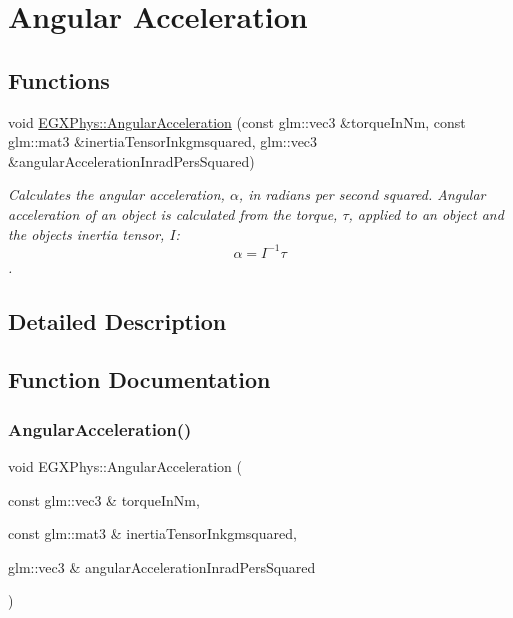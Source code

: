\hypertarget{group___e_g_x_phys-_kinetics-_angular_acceleration}{}\section{Angular Acceleration}
\label{group___e_g_x_phys-_kinetics-_angular_acceleration}
\subsection*{Functions}
\begin{DoxyCompactItemize}
\item 
void \mbox{\hyperlink{group___e_g_x_phys-_kinetics-_angular_acceleration_gaf636e9a30f3db4e170829efbf40efbbe}{E\+G\+X\+Phys\+::\+Angular\+Acceleration}} (const glm\+::vec3 \&torque\+In\+Nm, const glm\+::mat3 \&inertia\+Tensor\+Inkgmsquared, glm\+::vec3 \&angular\+Acceleration\+Inrad\+Pers\+Squared)
\begin{DoxyCompactList}\small\item\em Calculates the angular acceleration, $\alpha$, in radians per second squared. Angular acceleration of an object is calculated from the torque, $\tau$, applied to an object and the object\textquotesingle{}s inertia tensor, $I$\+: \[\alpha=I^{-1} \tau \]. \end{DoxyCompactList}\end{DoxyCompactItemize}


\subsection{Detailed Description}


\subsection{Function Documentation}
\mbox{\label{group___e_g_x_phys-_kinetics-_angular_acceleration_gaf636e9a30f3db4e170829efbf40efbbe}} 
\subsubsection{\texorpdfstring{Angular\+Acceleration()}{AngularAcceleration()}}
{\footnotesize\ttfamily void E\+G\+X\+Phys\+::\+Angular\+Acceleration (\begin{DoxyParamCaption}\item[{const glm\+::vec3 \&}]{torque\+In\+Nm,  }\item[{const glm\+::mat3 \&}]{inertia\+Tensor\+Inkgmsquared,  }\item[{glm\+::vec3 \&}]{angular\+Acceleration\+Inrad\+Pers\+Squared }\end{DoxyParamCaption})\hspace{0.3cm}{\ttfamily [inline]}}



